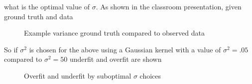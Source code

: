 \documentclass{article}
\begin{document}
what is the optimal value of $\sigma$. As shown in the classroom presentation, given ground truth and data
\begin{figure}[H]
    \centering
    \qquad
    \caption{Example variance ground truth compared to observed data}%
\end{figure}
So if $\sigma^2$ is chosen for the above using a Gaussian kernel with a value of $\sigma^2=.05$ compared to $\sigma^2=50$ underfit and overfit are shown
\begin{figure}[H]
    \centering
    \qquad
    \caption{Overfit and underfit by suboptimal $\sigma$ choices}%
\end{figure}
\end{document}
